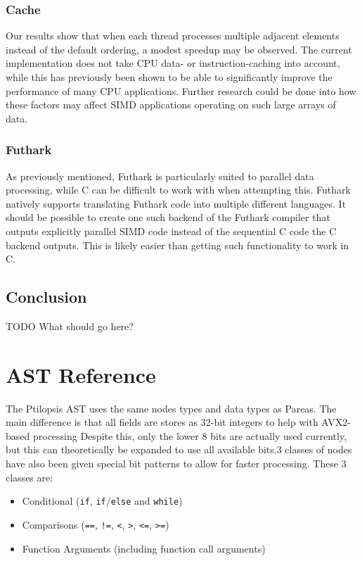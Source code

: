 \documentclass[12pt,dvipsnames]{article}
\newcommand{\helpme}[1]{{\color{red}#1}}
\newcommand{\icpp}[1]{\texttt{#1}}
\newcommand{\mono}[1]{\texttt{#1}}
\newcommand{\Rplus}{\protect\hspace{-.1em}\protect\raisebox{.35ex}{\smaller{\smaller\textbf{+}}}}
\newcommand{\Cpp}{\mbox{C\Rplus\Rplus}\xspace}
\begin{document}
\subsubsection*{Cache}
Our results show that when each thread processes multiple adjacent elements instead of the default ordering, a modest speedup may be observed. The current implementation does not take CPU data- or instruction-caching into account, while this has previously been shown to be able to significantly improve the performance of many CPU applications. Further research could be done into how these factors may affect SIMD applications operating on such large arrays of data.

\subsubsection*{Futhark}
As previously mentioned, Futhark is particularly suited to parallel data processing, while \Cpp can be difficult to work with when attempting this. Futhark natively supports translating Futhark code into multiple different languages. It should be possible to create one such backend of the Futhark compiler that outputs explicitly parallel SIMD code instead of the sequential C code the C backend outputs. This is likely easier than getting such functionality to work in \Cpp. %

\subsection{Conclusion} \label{conclusion}
\helpme{TODO What should go here?}

\newpage





\appendix

\newpage

\section{AST Reference} \label{ast}
The Ptilopsis AST uses the same nodes types and data types as Pareas. The main difference is that all fields are stores as 32-bit integers to help with AVX2-based processing Despite this, only the lower 8 bits are actually used currently, but this can theoretically be expanded to use all available bits.3 classes of nodes have also been given special bit patterns to allow for faster processing. These 3 classes are:
\begin{itemize}
    \item Conditional (\icpp{if}, \icpp{if}/\icpp{else} and \icpp{while})
    \item Comparisons (\mono{==}, \mono{!=}, \mono{<}, \mono{>}, \mono{<=}, \mono{>=})
    \item Function Arguments (including function call arguments)
\end{itemize}
\end{document}
